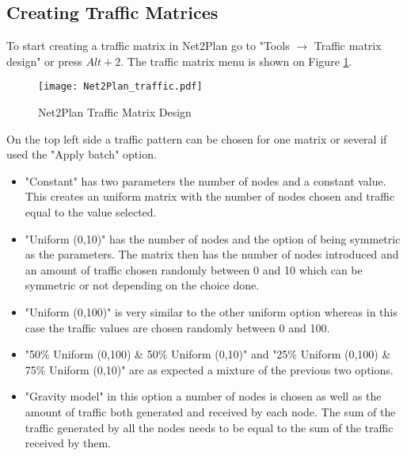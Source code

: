 	\subsection{Creating Traffic Matrices}
    To start creating a traffic matrix in Net2Plan go to "Tools $\rightarrow$ Traffic matrix design" or press $Alt+2$. The traffic matrix menu is shown on Figure \ref{Net2Plan_traffic}.
	
	\begin{figure}[h!]
		\vspace{-0.3cm}
		\centering	
		\texttt{[image: Net2Plan\_traffic.pdf]}
		\caption{Net2Plan Traffic Matrix Design}
		\label{Net2Plan_traffic}
	\end{figure}
		
	\vspace{-0.3cm}
	
	On the top left side a traffic pattern can be chosen for one matrix or several if used the "Apply batch" option.
	
	\begin{itemize}	
		
		\item{"Constant" has two parameters the number of nodes and a constant value. This creates an uniform matrix with the number of nodes chosen and traffic equal to the value selected.}
	
		\item{"Uniform (0,10)" has the number of nodes and the option of being symmetric as the parameters. The matrix then has the number of nodes introduced and an amount of traffic chosen randomly between 0 and 10 which can be symmetric or not depending on the choice done.}
	
		\item{"Uniform (0,100)" is very similar to the other uniform option whereas in this case the traffic values are chosen randomly between 0 and 100.}
	
		\item{"50\% Uniform (0,100) \& 50\% Uniform (0,10)" and "25\% Uniform (0,100) \& 75\% Uniform (0,10)" are as expected a mixture of the previous two options.}
	
		\item{"Gravity model" in this option a number of nodes is chosen as well as the amount of traffic both generated and received by each node. The sum of the traffic generated by all the nodes needs to be equal to the sum of the traffic received by them. }

	\end{itemize}
	
